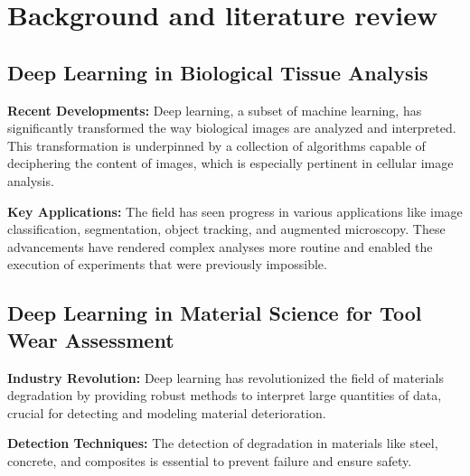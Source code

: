 \section{Background and literature review}
\label{sec:problem_description}

\subsection*{Deep Learning in Biological Tissue Analysis}

\textbf{Recent Developments:} Deep learning, a subset of machine learning, has significantly transformed the way biological images are analyzed and interpreted. This transformation is underpinned by a collection of algorithms capable of deciphering the content of images, which is especially pertinent in cellular image analysis.\cite{ref1}

\textbf{Key Applications:} The field has seen progress in various applications like image classification, segmentation, object tracking, and augmented microscopy. These advancements have rendered complex analyses more routine and enabled the execution of experiments that were previously impossible.\cite{ref2}

\subsection*{Deep Learning in Material Science for Tool Wear Assessment}

\textbf{Industry Revolution:} Deep learning has revolutionized the field of materials degradation by providing robust methods to interpret large quantities of data, crucial for detecting and modeling material deterioration.\cite{ref3}

\textbf{Detection Techniques:} The detection of degradation in materials like steel, concrete, and composites is essential to prevent failure and ensure safety.\cite{ref4}

\FloatBarrier
